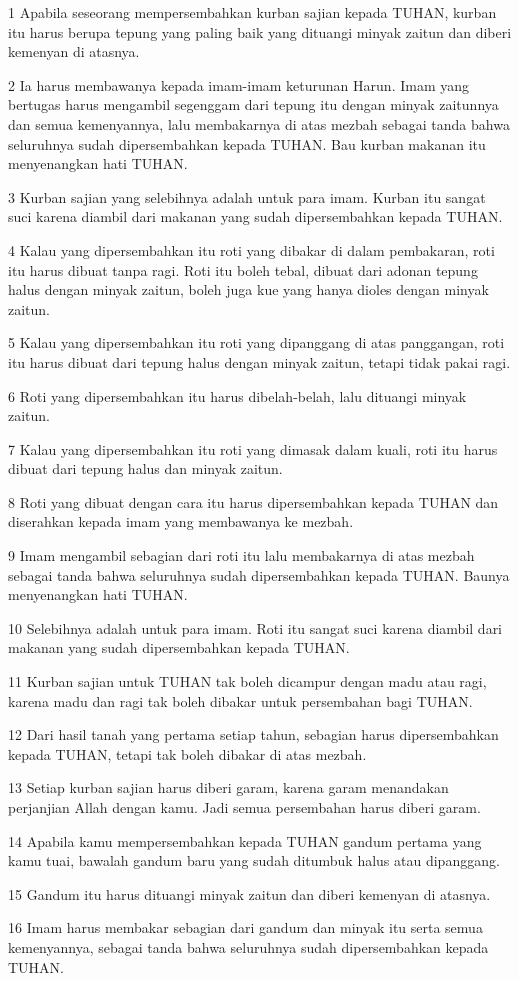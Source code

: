 \par 1 Apabila seseorang mempersembahkan kurban sajian kepada TUHAN, kurban itu harus berupa tepung yang paling baik yang dituangi minyak zaitun dan diberi kemenyan di atasnya.
\par 2 Ia harus membawanya kepada imam-imam keturunan Harun. Imam yang bertugas harus mengambil segenggam dari tepung itu dengan minyak zaitunnya dan semua kemenyannya, lalu membakarnya di atas mezbah sebagai tanda bahwa seluruhnya sudah dipersembahkan kepada TUHAN. Bau kurban makanan itu menyenangkan hati TUHAN.
\par 3 Kurban sajian yang selebihnya adalah untuk para imam. Kurban itu sangat suci karena diambil dari makanan yang sudah dipersembahkan kepada TUHAN.
\par 4 Kalau yang dipersembahkan itu roti yang dibakar di dalam pembakaran, roti itu harus dibuat tanpa ragi. Roti itu boleh tebal, dibuat dari adonan tepung halus dengan minyak zaitun, boleh juga kue yang hanya dioles dengan minyak zaitun.
\par 5 Kalau yang dipersembahkan itu roti yang dipanggang di atas panggangan, roti itu harus dibuat dari tepung halus dengan minyak zaitun, tetapi tidak pakai ragi.
\par 6 Roti yang dipersembahkan itu harus dibelah-belah, lalu dituangi minyak zaitun.
\par 7 Kalau yang dipersembahkan itu roti yang dimasak dalam kuali, roti itu harus dibuat dari tepung halus dan minyak zaitun.
\par 8 Roti yang dibuat dengan cara itu harus dipersembahkan kepada TUHAN dan diserahkan kepada imam yang membawanya ke mezbah.
\par 9 Imam mengambil sebagian dari roti itu lalu membakarnya di atas mezbah sebagai tanda bahwa seluruhnya sudah dipersembahkan kepada TUHAN. Baunya menyenangkan hati TUHAN.
\par 10 Selebihnya adalah untuk para imam. Roti itu sangat suci karena diambil dari makanan yang sudah dipersembahkan kepada TUHAN.
\par 11 Kurban sajian untuk TUHAN tak boleh dicampur dengan madu atau ragi, karena madu dan ragi tak boleh dibakar untuk persembahan bagi TUHAN.
\par 12 Dari hasil tanah yang pertama setiap tahun, sebagian harus dipersembahkan kepada TUHAN, tetapi tak boleh dibakar di atas mezbah.
\par 13 Setiap kurban sajian harus diberi garam, karena garam menandakan perjanjian Allah dengan kamu. Jadi semua persembahan harus diberi garam.
\par 14 Apabila kamu mempersembahkan kepada TUHAN gandum pertama yang kamu tuai, bawalah gandum baru yang sudah ditumbuk halus atau dipanggang.
\par 15 Gandum itu harus dituangi minyak zaitun dan diberi kemenyan di atasnya.
\par 16 Imam harus membakar sebagian dari gandum dan minyak itu serta semua kemenyannya, sebagai tanda bahwa seluruhnya sudah dipersembahkan kepada TUHAN.

